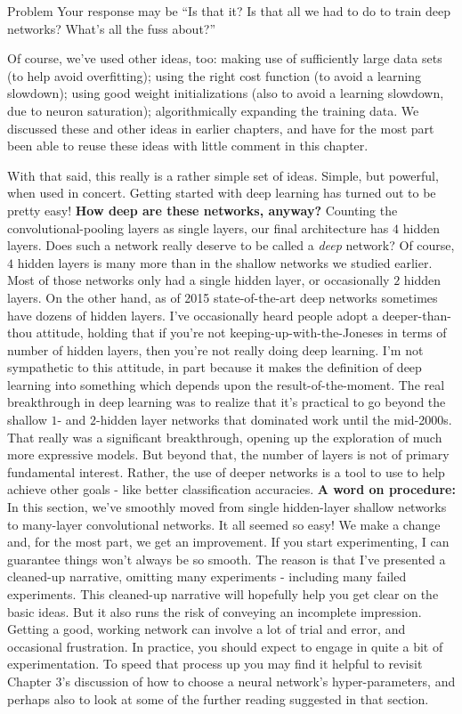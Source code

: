 \begin{exerciseBox}{Problem}
Your response may be ``Is that it? Is that all we had to do to train deep networks? What's all the fuss about?''


Of course, we've used other ideas, too: making use of sufficiently large data sets (to help avoid overfitting); using the right cost function (to avoid a learning slowdown); using good weight initializations (also to avoid a learning slowdown, due to neuron saturation); algorithmically expanding the training data. We discussed these and other ideas in earlier chapters, and have for the most part been able to reuse these ideas with little comment in this chapter.


With that said, this really is a rather simple set of ideas. Simple, but powerful, when used in concert. Getting started with deep learning has turned out to be pretty easy! \textbf{How deep are these networks, anyway?} Counting the convolutional-pooling layers as single layers, our final architecture has $4$ hidden layers. Does such a network really deserve to be called a \emph{deep} network? Of course, $4$ hidden layers is many more than in the shallow networks we studied earlier. Most of those networks only had a single hidden layer, or occasionally $2$ hidden layers. On the other hand, as of 2015 state-of-the-art deep networks sometimes have dozens of hidden layers. I've occasionally heard people adopt a deeper-than-thou attitude, holding that if you're not keeping-up-with-the-Joneses in terms of number of hidden layers, then you're not really doing deep learning. I'm not sympathetic to this attitude, in part because it makes the definition of deep learning into something which depends upon the result-of-the-moment. The real breakthrough in deep learning was to realize that it's practical to go beyond the shallow $1$- and $2$-hidden layer networks that dominated work until the mid-2000s. That really was a significant breakthrough, opening up the exploration of much more expressive models. But beyond that, the number of layers is not of primary fundamental interest. Rather, the use of deeper networks is a tool to use to help achieve other goals - like better classification accuracies. \textbf{A word on procedure:} In this section, we've smoothly moved from single hidden-layer shallow networks to many-layer convolutional networks. It all seemed so easy! We make a change and, for the most part, we get an improvement. If you start experimenting, I can guarantee things won't always be so smooth. The reason is that I've presented a cleaned-up narrative, omitting many experiments - including many failed experiments. This cleaned-up narrative will hopefully help you get clear on the basic ideas. But it also runs the risk of conveying an incomplete impression. Getting a good, working network can involve a lot of trial and error, and occasional frustration. In practice, you should expect to engage in quite a bit of experimentation. To speed that process up you may find it helpful to revisit Chapter 3's discussion of how to choose a neural network's hyper-parameters, and perhaps also to look at some of the further reading suggested in that section.

\end{exerciseBox}



